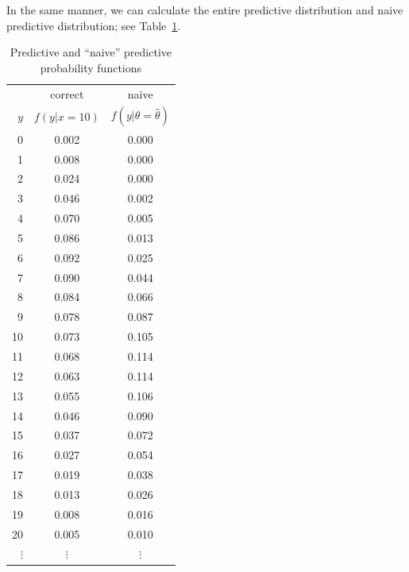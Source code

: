 {In the same manner, we can calculate the entire predictive distribution
and naive predictive distribution; see Table~\ref{tab:predsimple}.

\newpage

\begin{table}[ht]
\bigskip

\begin{tabular}{|r|c|c|}
\cline{2-3}
\multicolumn{1}{c|}{~}& correct & naive \\
\cline{1-1}
$y$ & $f(y|x=10)$ & $f(y|\theta=\hat{\theta})$ \\
\hline
0 & 0.002 & 0.000 \\
1 & 0.008 & 0.000 \\
2 & 0.024 & 0.000 \\
3 & 0.046 & 0.002 \\
4 & 0.070 & 0.005 \\
5 & 0.086 & 0.013 \\
6 & 0.092 & 0.025 \\
7 & 0.090 & 0.044 \\
8 & 0.084 & 0.066 \\
9 & 0.078 & 0.087 \\
10 & 0.073 & 0.105 \\
11 & 0.068 & 0.114 \\
12 & 0.063 & 0.114 \\
13 & 0.055 & 0.106 \\
14 & 0.046 & 0.090 \\
15 & 0.037 & 0.072 \\
16 & 0.027 & 0.054 \\
17 & 0.019 & 0.038 \\
18 & 0.013 & 0.026 \\
19 & 0.008 & 0.016 \\
20 & 0.005 & 0.010 \\
$\vdots$ & $\vdots$ & $\vdots$ \\
\hline
\end{tabular}
\caption{Predictive and ``naive'' predictive probability functions}
\label{tab:predsimple}


\end{table}}
